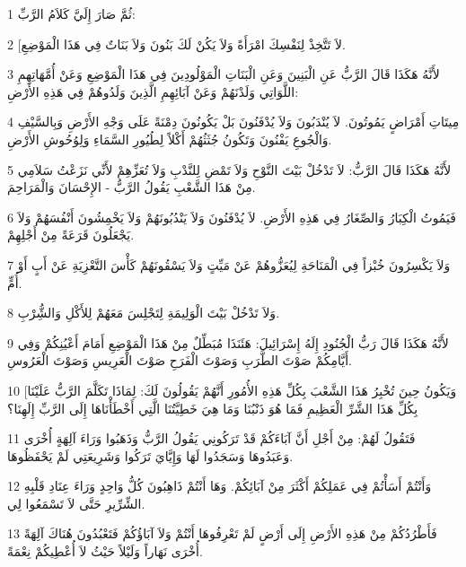 \par 1 ثُمَّ صَارَ إِلَيَّ كَلاَمُ الرَّبِّ:
\par 2 [لاَ تَتَّخِذْ لِنَفْسِكَ امْرَأَةً وَلاَ يَكُنْ لَكَ بَنُونَ وَلاَ بَنَاتٌ فِي هَذَا الْمَوْضِعِ.
\par 3 لأَنَّهُ هَكَذَا قَالَ الرَّبُّ عَنِ الْبَنِينَ وَعَنِ الْبَنَاتِ الْمَوْلُودِينَ فِي هَذَا الْمَوْضِعِ وَعَنْ أُمَّهَاتِهِمِ اللَّوَاتِي وَلَدْنَهُمْ وَعَنْ آبَائِهِمِ الَّذِينَ وَلَدُوهُمْ فِي هَذِهِ الأَرْضِ:
\par 4 مِيتَاتِ أَمْرَاضٍ يَمُوتُونَ. لاَ يُنْدَبُونَ وَلاَ يُدْفَنُونَ بَلْ يَكُونُونَ دِمْنَةً عَلَى وَجْهِ الأَرْضِ وَبِالسَّيْفِ وَالْجُوعِ يَفْنُونَ وَتَكُونُ جُثَثُهُمْ أَكْلاً لِطُيُورِ السَّمَاءِ وَلِوُحُوشِ الأَرْضِ.
\par 5 لأَنَّهُ هَكَذَا قَالَ الرَّبُّ: لاَ تَدْخُلْ بَيْتَ النَّوْحِ وَلاَ تَمْضِ لِلنَّدْبِ وَلاَ تُعَزِّهِمْ لأَنِّي نَزَعْتُ سَلاَمِي مِنْ هَذَا الشَّعْبِ يَقُولُ الرَّبُّ - الإِحْسَانَ وَالْمَرَاحِمَ.
\par 6 فَيَمُوتُ الْكِبَارُ وَالصِّغَارُ فِي هَذِهِ الأَرْضِ. لاَ يُدْفَنُونَ وَلاَ يَنْدُبُونَهُمْ وَلاَ يَخْمِشُونَ أَنْفُسَهُمْ وَلاَ يَجْعَلُونَ قَرَعَةً مِنْ أَجْلِهِمْ.
\par 7 وَلاَ يَكْسِرُونَ خُبْزاً فِي الْمَنَاحَةِ لِيُعَزُّوهُمْ عَنْ مَيِّتٍ وَلاَ يَسْقُونَهُمْ كَأْسَ التَّعْزِيَةِ عَنْ أَبٍ أَوْ أُمٍّ.
\par 8 وَلاَ تَدْخُلْ بَيْتَ الْوَلِيمَةِ لِتَجْلِسَ مَعَهُمْ لِلأَكْلِ وَالشُِّرْبِ.
\par 9 لأَنَّهُ هَكَذَا قَالَ رَبُّ الْجُنُودِ إِلَهُ إِسْرَائِيلَ: هَئَنَذَا مُبَطِّلٌ مِنْ هَذَا الْمَوْضِعِ أَمَامَ أَعْيُنِكُمْ وَفِي أَيَّامِكُمْ صَوْتَ الطَّرَبِ وَصَوْتَ الْفَرَحِ صَوْتَ الْعَرِيسِ وَصَوْتَ الْعَرُوسِ.
\par 10 [وَيَكُونُ حِينَ تُخْبِرُ هَذَا الشَّعْبَ بِكُلِّ هَذِهِ الأُمُورِ أَنَّهُمْ يَقُولُونَ لَكَ: لِمَاذَا تَكَلَّمَ الرَّبُّ عَلَيْنَا بِكُلِّ هَذَا الشَّرِّ الْعَظِيمِ فَمَا هُوَ ذَنْبُنَا وَمَا هِيَ خَطِيَّتُنَا الَّتِي أَخْطَأْنَاهَا إِلَى الرَّبِّ إِلَهِنَا؟
\par 11 فَتَقُولُ لَهُمْ: مِنْ أَجْلِ أَنَّ آبَاءَكُمْ قَدْ تَرَكُونِي يَقُولُ الرَّبُّ وَذَهَبُوا وَرَاءَ آلِهَةٍ أُخْرَى وَعَبَدُوهَا وَسَجَدُوا لَهَا وَإِيَّايَ تَرَكُوا وَشَرِيعَتِي لَمْ يَحْفَظُوهَا.
\par 12 وَأَنْتُمْ أَسَأْتُمْ فِي عَمَلِكُمْ أَكْثَرَ مِنْ آبَائِكُمْ. وَهَا أَنْتُمْ ذَاهِبُونَ كُلُّ وَاحِدٍ وَرَاءَ عِنَادِ قَلْبِهِ الشِّرِّيرِ حَتَّى لاَ تَسْمَعُوا لِي.
\par 13 فَأَطْرُدُكُمْ مِنْ هَذِهِ الأَرْضِ إِلَى أَرْضٍ لَمْ تَعْرِفُوهَا أَنْتُمْ وَلاَ آبَاؤُكُمْ فَتَعْبُدُونَ هُنَاكَ آلِهَةً أُخْرَى نَهَاراً وَلَيْلاً حَيْثُ لاَ أُعْطِيكُمْ نِعْمَةً.
